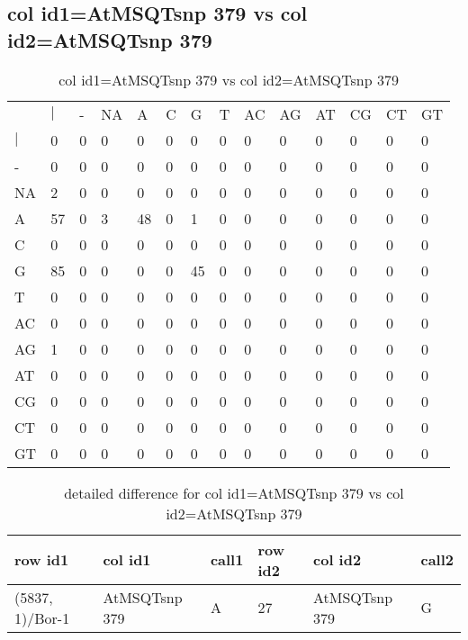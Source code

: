 \subsection{col id1=AtMSQTsnp 379 vs col id2=AtMSQTsnp 379}
\begin{center}
\begin{longtable}{|l|l|l|l|l|l|l|l|l|l|l|l|l|l|}
\caption{col id1=AtMSQTsnp 379 vs col id2=AtMSQTsnp 379} \label{table_dm694}\\
\hline
\\
\hline
&$|$&-&NA&A&C&G&T&AC&AG&AT&CG&CT&GT\\
$|$&0&0&0&0&0&0&0&0&0&0&0&0&0\\
-&0&0&0&0&0&0&0&0&0&0&0&0&0\\
NA&2&0&0&0&0&0&0&0&0&0&0&0&0\\
A&57&0&3&48&0&1&0&0&0&0&0&0&0\\
C&0&0&0&0&0&0&0&0&0&0&0&0&0\\
G&85&0&0&0&0&45&0&0&0&0&0&0&0\\
T&0&0&0&0&0&0&0&0&0&0&0&0&0\\
AC&0&0&0&0&0&0&0&0&0&0&0&0&0\\
AG&1&0&0&0&0&0&0&0&0&0&0&0&0\\
AT&0&0&0&0&0&0&0&0&0&0&0&0&0\\
CG&0&0&0&0&0&0&0&0&0&0&0&0&0\\
CT&0&0&0&0&0&0&0&0&0&0&0&0&0\\
GT&0&0&0&0&0&0&0&0&0&0&0&0&0\\
\hline
\end{longtable}
\end{center}

\begin{center}
\begin{longtable}{|l|l|l|l|l|l|}
\caption{detailed difference for col id1=AtMSQTsnp 379 vs col id2=AtMSQTsnp 379} \label{table_dm695}\\
\hline
row id1&col id1&call1&row id2&col id2&call2\\
\hline
(5837, 1)/Bor-1&AtMSQTsnp 379&A&27&AtMSQTsnp 379&G\\
\hline
\end{longtable}
\end{center}

